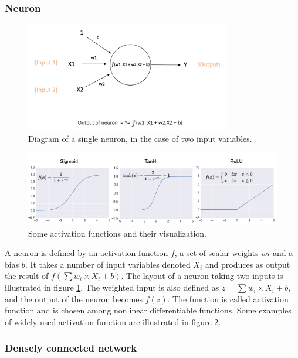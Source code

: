 \subsubsection{Neuron}

\begin{figure}
    \centering
    \includegraphics[width=0.8\textwidth]{Images/neuron_diagram}
    \caption{Diagram of a single neuron, in the case of two input variables.}
    \label{fig:neuron_diagram}
\end{figure}


\begin{figure}
    \centering
    \includegraphics[width=\textwidth]{Images/activation_functions.png}
    \caption{Some activation functions and their visualization.}
    \label{fig:activation_functions}
\end{figure}

A neuron is defined by an activation function $f$, a set of scalar weights $wi$ and a bias $b$. It takes a number of input variables denoted $X_i$ and produces as output the result of $f(\sum w_i\times X_i + b)$. The layout of a neuron taking two inputs is illustrated in figure \ref{fig:neuron_diagram}. The weighted input is also defined as $z = \sum w_i\times X_i + b$, and the output of the neuron becomes $f(z)$. The function is called activation function and is chosen among nonlinear differentiable functions. Some examples of widely used activation function are illustrated in figure \ref{fig:activation_functions}.

\subsubsection{Densely connected network}


